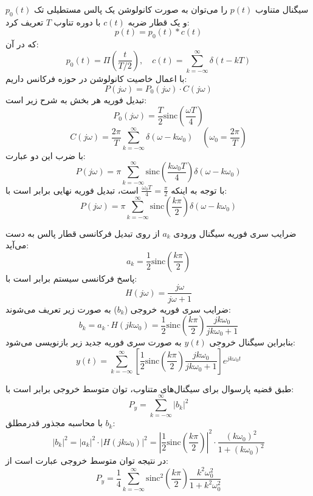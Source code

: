 سیگنال متناوب $p(t)$ را می‌توان به صورت کانولوشن یک پالس مستطیلی تک $p_0(t)$ و یک قطار ضربه $c(t)$ با دوره تناوب $T$ تعریف کرد:
\[ p(t) = p_0(t) * c(t) \]
که در آن:
\[ p_0(t) = \Pi\left(\frac{t}{T/2}\right), \quad c(t) = \sum_{k=-\infty}^{\infty} \delta(t - kT) \]
با اعمال خاصیت کانولوشن در حوزه فرکانس داریم:
\[ P(j\omega) = P_0(j\omega) \cdot C(j\omega) \]
تبدیل فوریه هر بخش به شرح زیر است:
\[ P_0(j\omega) = \frac{T}{2} \text{sinc}\left(\frac{\omega T}{4}\right) \]
\[ C(j\omega) = \frac{2\pi}{T} \sum_{k=-\infty}^{\infty} \delta(\omega - k\omega_0) \quad \left(\omega_0 = \frac{2\pi}{T}\right) \]
با ضرب این دو عبارت:
\[ P(j\omega) = \pi \sum_{k=-\infty}^{\infty} \text{sinc}\left(\frac{k\omega_0 T}{4}\right) \delta(\omega - k\omega_0) \]
با توجه به اینکه $\frac{\omega_0 T}{4} = \frac{\pi}{2}$ است، تبدیل فوریه نهایی برابر است با:
\[ P(j\omega) = \pi \sum_{k=-\infty}^{\infty} \text{sinc}\left(\frac{k\pi}{2}\right) \delta(\omega - k\omega_0) \]

ضرایب سری فوریه سیگنال ورودی $a_k$ از روی تبدیل فرکانسی قطار پالس به دست می‌آید:
\[ a_k = \frac{1}{2} \text{sinc}\left(\frac{k\pi}{2}\right) \]
پاسخ فرکانسی سیستم برابر است با:
\[ H(j\omega) = \frac{j\omega}{j\omega + 1} \]
ضرایب سری فوریه خروجی ($b_k$) به صورت زیر تعریف می‌شوند:
\[ b_k = a_k \cdot H(jk\omega_0) = \frac{1}{2} \text{sinc}\left(\frac{k\pi}{2}\right) \frac{jk\omega_0}{jk\omega_0 + 1} \]
بنابراین سیگنال خروجی $y(t)$ به صورت سری فوریه جدید زیر بازنویسی می‌شود:
\[ y(t) = \sum_{k=-\infty}^{\infty} \left[ \frac{1}{2} \text{sinc}\left(\frac{k\pi}{2}\right) \frac{jk\omega_0}{jk\omega_0 + 1} \right] e^{j k \omega_0 t} \]

طبق قضیه پارسوال برای سیگنال‌های متناوب، توان متوسط خروجی برابر است با:
\[ P_y = \sum_{k=-\infty}^{\infty} |b_k|^2 \]
با محاسبه مجذور قدرمطلق $b_k$:
\[ |b_k|^2 = |a_k|^2 \cdot |H(jk\omega_0)|^2 = \left| \frac{1}{2} \text{sinc}\left(\frac{k\pi}{2}\right) \right|^2 \cdot \frac{(k\omega_0)^2}{1 + (k\omega_0)^2} \]
در نتیجه توان متوسط خروجی عبارت است از:
\[ P_y = \frac{1}{4} \sum_{k=-\infty}^{\infty} \text{sinc}^2\left(\frac{k\pi}{2}\right) \frac{k^2\omega_0^2}{1 + k^2\omega_0^2} \]
